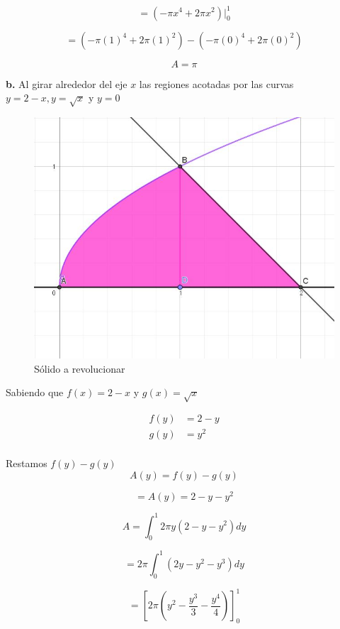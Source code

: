 \documentclass[12pt]{article}
\begin{document}
\begin{flushleft}
$$=\left ( -\pi x^{4}+2\pi x^{2}\right )|_{0}^{1}$$


$$=\left ( -\pi \left ( 1 \right )^{4}+2\pi \left ( 1 \right )^{2} \right ) - \left ( -\pi \left ( 0 \right )^{4}+2\pi \left ( 0 \right )^{2} \right )$$


$$A=\pi$$


\textbf{b.} Al girar alrededor del eje $x$ las regiones acotadas por las curvas $y=2-x, y=\sqrt{x}$ y $y=0$

\begin{figure}[H]
    \centering
    \includegraphics[scale=0.38]{WhatsApp Image 2023-06-03 at 9.34.00 PM.jpeg}
    \caption{Sólido a revolucionar}
    \label{fig:enter-label}
\end{figure}

Sabiendo que $f(x)=2-x$ y $g(x)=\sqrt{x}$

\begin{align*}
f(y)&=2-y\\
g(y)&=y^{2}\\   
\end{align*}

Restamos $f(y)-g(y)$\\


$$A(y) = f(y)-g(y)$$

$$=A(y) =2-y-y^{2}$$


$$A =\int_{0}^{1} 2\pi y \left ( 2-y-y^{2} \right )dy$$

$$=2\pi \int_{0}^{1}\left ( 2y-y^2-y^3 \right )dy$$

$$=\left[ 2\pi \left ( y^2-\frac{y^3}{3}-\frac{y^4}{4} \right ) \right]_{0}^{1}$$


\end{flushleft}
\end{document}
